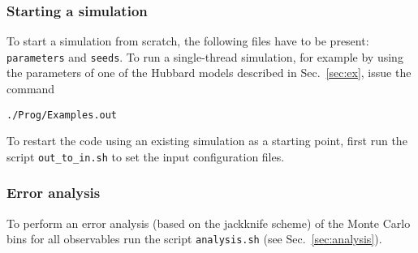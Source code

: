 \subsubsection{Starting a simulation}

To start a simulation from scratch, the following files have to be present: \texttt{parameters} and \texttt{seeds}. 
To run a single-thread simulation, for example by using the parameters of one of the  Hubbard models described in Sec.~\ref{sec:ex}, issue the command
\begin{verbatim}
./Prog/Examples.out
\end{verbatim}
To restart the code using an existing simulation as a starting point, first run the script \texttt{out\_to\_in.sh} to set 
the input configuration files.

\subsubsection{Error analysis}

To perform an error analysis (based on the jackknife scheme) of the Monte Carlo bins for all observables run the script \texttt{analysis.sh} 
(see Sec.~\ref{sec:analysis}).

 



